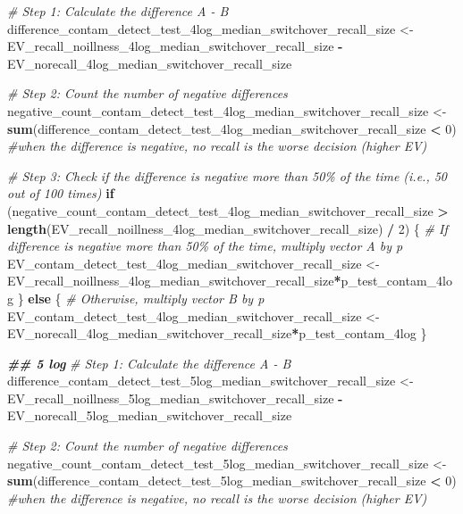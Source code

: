 \documentclass[
]{article}
\newenvironment{Shaded}{\begin{snugshade}}{\end{snugshade}}
\newcommand{\CommentTok}[1]{\textcolor[rgb]{0.56,0.35,0.01}{\textit{#1}}}
\newcommand{\ControlFlowTok}[1]{\textcolor[rgb]{0.13,0.29,0.53}{\textbf{#1}}}
\newcommand{\DecValTok}[1]{\textcolor[rgb]{0.00,0.00,0.81}{#1}}
\newcommand{\DocumentationTok}[1]{\textcolor[rgb]{0.56,0.35,0.01}{\textbf{\textit{#1}}}}
\newcommand{\FunctionTok}[1]{\textcolor[rgb]{0.13,0.29,0.53}{\textbf{#1}}}
\newcommand{\NormalTok}[1]{#1}
\newcommand{\OtherTok}[1]{\textcolor[rgb]{0.56,0.35,0.01}{#1}}
\newcommand{\SpecialCharTok}[1]{\textcolor[rgb]{0.81,0.36,0.00}{\textbf{#1}}}
\begin{document}
\begin{Shaded}
\begin{Highlighting}[]
\CommentTok{\# Step 1: Calculate the difference A {-} B}
\NormalTok{difference\_contam\_detect\_test\_4log\_median\_switchover\_recall\_size }\OtherTok{\textless{}{-}}\NormalTok{ EV\_recall\_noillness\_4log\_median\_switchover\_recall\_size }\SpecialCharTok{{-}}\NormalTok{ EV\_norecall\_4log\_median\_switchover\_recall\_size}

\CommentTok{\# Step 2: Count the number of negative differences}
\NormalTok{negative\_count\_contam\_detect\_test\_4log\_median\_switchover\_recall\_size }\OtherTok{\textless{}{-}} \FunctionTok{sum}\NormalTok{(difference\_contam\_detect\_test\_4log\_median\_switchover\_recall\_size }\SpecialCharTok{\textless{}} \DecValTok{0}\NormalTok{) }\CommentTok{\#when the difference is negative, no recall is the worse decision (higher EV)}

\CommentTok{\# Step 3: Check if the difference is negative more than 50\% of the time (i.e., 50 out of 100 times)}
\ControlFlowTok{if}\NormalTok{ (negative\_count\_contam\_detect\_test\_4log\_median\_switchover\_recall\_size }\SpecialCharTok{\textgreater{}} \FunctionTok{length}\NormalTok{(EV\_recall\_noillness\_4log\_median\_switchover\_recall\_size) }\SpecialCharTok{/} \DecValTok{2}\NormalTok{) \{}
  \CommentTok{\# If difference is negative more than 50\% of the time, multiply vector A by p}
\NormalTok{  EV\_contam\_detect\_test\_4log\_median\_switchover\_recall\_size }\OtherTok{\textless{}{-}}\NormalTok{ EV\_recall\_noillness\_4log\_median\_switchover\_recall\_size}\SpecialCharTok{*}\NormalTok{p\_test\_contam\_4log}
\NormalTok{\} }\ControlFlowTok{else}\NormalTok{ \{}
  \CommentTok{\# Otherwise, multiply vector B by p}
\NormalTok{ EV\_contam\_detect\_test\_4log\_median\_switchover\_recall\_size  }\OtherTok{\textless{}{-}}\NormalTok{ EV\_norecall\_4log\_median\_switchover\_recall\_size}\SpecialCharTok{*}\NormalTok{p\_test\_contam\_4log}
\NormalTok{\}}


\DocumentationTok{\#\# 5 log}
\CommentTok{\# Step 1: Calculate the difference A {-} B}
\NormalTok{difference\_contam\_detect\_test\_5log\_median\_switchover\_recall\_size }\OtherTok{\textless{}{-}}\NormalTok{ EV\_recall\_noillness\_5log\_median\_switchover\_recall\_size }\SpecialCharTok{{-}}\NormalTok{ EV\_norecall\_5log\_median\_switchover\_recall\_size}

\CommentTok{\# Step 2: Count the number of negative differences}
\NormalTok{negative\_count\_contam\_detect\_test\_5log\_median\_switchover\_recall\_size }\OtherTok{\textless{}{-}} \FunctionTok{sum}\NormalTok{(difference\_contam\_detect\_test\_5log\_median\_switchover\_recall\_size }\SpecialCharTok{\textless{}} \DecValTok{0}\NormalTok{) }\CommentTok{\#when the difference is negative, no recall is the worse decision (higher EV)}


\end{Highlighting}
\end{Shaded}
\end{document}
